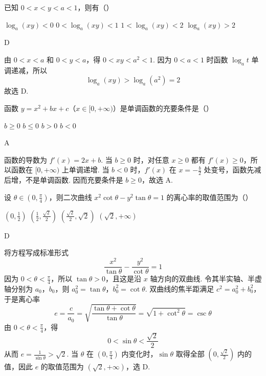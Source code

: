\begin{problem}
已知 \(0 < x < y < a < 1\)，则有（\quad）

\choices
    {\(\log_a(xy) < 0\)}
    {\(0 < \log_a(xy) < 1\)}
    {\(1 < \log_a(xy) < 2\)}
    {\(\log_a(xy) > 2\)}
\end{problem}

\begin{answer}
D
\end{answer}

\begin{solution}
由 \(0<x<a\) 和 \(0<y<a\)，得 \(0<xy<a^{2}<1\). 因为 \(0<a<1\) 时函数 \(\log_{a}t\) 单调递减，所以
\[
\log_{a}(xy)>\log_{a}(a^{2})=2
\]
故选 D.
\end{solution}

\begin{problem}
函数 \( y = x^{2} + bx + c \)（\(x \in [0, +\infty)\)）是单调函数的充要条件是（\quad）

\choices
    {\(b \geqslant 0\)}
    {\(b \leqslant 0\)}
    {\(b > 0\)}
    {\(b < 0\)}
\end{problem}

\begin{answer}
A
\end{answer}

\begin{solution}
函数的导数为 \(f'(x)=2x+b\). 当 \(b\geqslant0\) 时，对任意 \(x\geqslant0\) 都有 \(f'(x)\geqslant0\)，所以函数在 \([0,+\infty)\) 上单调递增. 当 \(b<0\) 时，\(f'(x)\) 在 \(x=-\frac{b}{2}\) 处变号，函数先减后增，不是单调函数. 因而充要条件是 \(b\geqslant0\)，故选 A.
\end{solution}

\begin{problem}
设 \(\theta \in \left(0, \frac{\pi}{4}\right)\)，则二次曲线 \(x^{2} \cot \theta - y^{2} \tan \theta = 1\) 的离心率的取值范围为（\quad）

\choices
    {\(\left(0, \frac{1}{2}\right)\)}
    {\(\left(\frac{1}{2}, \frac{\sqrt{2}}{2}\right)\)}
    {\(\left(\frac{\sqrt{2}}{2}, \sqrt{2}\right)\)}
    {\(\left(\sqrt{2}, +\infty\right)\)}
\end{problem}

\begin{answer}
D
\end{answer}

\begin{solution}
将方程写成标准形式
\[
\frac{x^{2}}{\tan\theta}-\frac{y^{2}}{\cot\theta}=1
\]
因为 \(0<\theta<\frac{\pi}{4}\)，所以 \(\tan\theta>0\)，且这是沿 \(x\) 轴方向的双曲线. 令其半实轴、半虚轴分别为 \(a_0\)，\(b_0\)，则
\(a_0^{2}=\tan\theta\)，\(b_0^{2}=\cot\theta\).
双曲线的焦半距满足 \(c^{2}=a_0^{2}+b_0^{2}\)，于是离心率
\[
e=\frac{c}{a_0}=\sqrt{\frac{\tan\theta+\cot\theta}{\tan\theta}}=\sqrt{1+\cot^{2}\theta}=\csc\theta
\]
由 \(0<\theta<\frac{\pi}{4}\)，得
\[
0<\sin\theta<\frac{\sqrt{2}}{2}
\]
从而 \(e=\frac{1}{\sin\theta}>\sqrt{2}\). 当 \(\theta\) 在 \(\left(0,\frac{\pi}{4}\right)\) 内变化时，\(\sin\theta\) 取得全部 \(\left(0,\frac{\sqrt{2}}{2}\right)\) 内的值，因此 \(e\) 的取值范围为 \(\left(\sqrt{2},+\infty\right)\)，选 D.
\end{solution}

